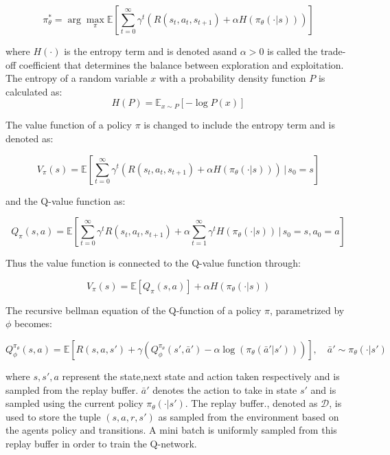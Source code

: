 \begin{equation}
	\pi^*_{\theta} = \arg \max_{\pi} \mathbb{E} \left[\sum_{t=0}^{\infty} \gamma^t \left( R(s_t, a_t, s_{t+1}) + \alpha H(\pi_{\theta}(\cdot|s)) \right) \right]
\end{equation}


where $H(\cdot)$ is the entropy term and is denoted asand $\alpha > 0$ is called the trade-off coefficient that determines the balance between exploration and exploitation. The entropy of a random variable $x$ with a probability density function $P$ is calculated as:
\begin{equation}
	H(P) = \mathbb{E}_{x \sim P}[-\log P(x)]
\end{equation}

 The value function of a policy $\pi$ is changed to include the entropy term and is denoted as:

\begin{equation}
	V_{\pi}(s) = \mathbb{E} \left[\sum_{t=0}^{\infty} \gamma^t \left( R(s_t, a_t, s_{t+1}) + \alpha H(\pi_{\theta}(\cdot|s)) \right) \,\Bigg|\, s_0 = s \right]
\end{equation}


and the Q-value function as:

\begin{equation}
	Q_{\pi}(s,a) = \mathbb{E} \left[\sum_{t=0}^{\infty} \gamma^t R(s_t, a_t, s_{t+1}) + \alpha \sum_{t=1}^{\infty} \gamma^t H(\pi_{\theta}(\cdot|s)) \,\Bigg|\, s_0 = s, a_0 = a \right]
\end{equation}

Thus the value function is connected to the Q-value function through:

\begin{equation}\label{eq:sac-value-function}
	V_{\pi} (s) = \mathbb{E} \left[Q_{\pi}(s,a) \right] + \alpha H(\pi_{\theta}(\cdot|s))
\end{equation}

The recursive bellman equation of the Q-function of a policy $\pi$, parametrized by $\phi$ becomes:

\begin{equation}
	Q_{\phi}^{\pi_{\theta}}(s,a) = \mathbb{E} \left[ R(s,a,s') + \gamma (Q_{\phi}^{\pi_{\theta}}(s',\bar{a}') - \alpha \log (\pi_{\theta}(\bar{a}'|s')))\right], \quad \bar{a}' \sim \pi_{\theta}(\cdot | s')
\end{equation}

where $s,s',a$ represent the state,next state and action taken respectively and is sampled from the replay buffer. $\bar{a}'$ denotes the action to take in state $s'$ and is sampled using the current policy $\pi_{\theta}(\cdot | s')$. The replay buffer., denoted as $\mathcal{D}$, is used to store the tuple $(s,a,r,s')$ as sampled from the environment based on the agents policy and transitions. A mini batch is uniformly sampled from this replay buffer in order to train the Q-network.

